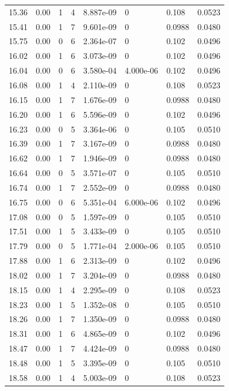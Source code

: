 \documentclass[preview]{standalone}
\begin{document}
{{{\begin{tabular}{L{1.2cm}C{1.2cm} C{0.3cm}C{0.5cm} C{1.4cm}C{1.4cm} C{1.4cm}C{1.4cm}}
  15.36  &  0.00  & 1     &  4 &  8.887e-09  & 0  & 0.108 &  0.0523   \\ 
  15.41  &  0.00  & 1     &  7 &  9.601e-09  & 0  & 0.0988 &  0.0480   \\ 
  15.75  &  0.00  & 0     &  6 &  2.364e-07  & 0  & 0.102 &  0.0496   \\ 
  16.02  &  0.00  & 1     &  6 &  3.073e-09  & 0  & 0.102 &  0.0496   \\ 
  16.04  &  0.00  & 0     &  6 &  3.580e-04  & 4.000e-06  & 0.102 &  0.0496   \\ 
  16.08  &  0.00  & 1     &  4 &  2.110e-09  & 0  & 0.108 &  0.0523   \\ 
  16.15  &  0.00  & 1     &  7 &  1.676e-09  & 0  & 0.0988 &  0.0480   \\ 
  16.20  &  0.00  & 1     &  6 &  5.596e-09  & 0  & 0.102 &  0.0496   \\ 
  16.23  &  0.00  & 0     &  5 &  3.364e-06  & 0  & 0.105 &  0.0510   \\ 
  16.39  &  0.00  & 1     &  7 &  3.167e-09  & 0  & 0.0988 &  0.0480   \\ 
  16.62  &  0.00  & 1     &  7 &  1.946e-09  & 0  & 0.0988 &  0.0480   \\ 
  16.64  &  0.00  & 0     &  5 &  3.571e-07  & 0  & 0.105 &  0.0510   \\ 
  16.74  &  0.00  & 1     &  7 &  2.552e-09  & 0  & 0.0988 &  0.0480   \\ 
  16.75  &  0.00  & 0     &  6 &  5.351e-04  & 6.000e-06  & 0.102 &  0.0496   \\ 
  17.08  &  0.00  & 0     &  5 &  1.597e-09  & 0  & 0.105 &  0.0510   \\ 
  17.51  &  0.00  & 1     &  5 &  3.433e-09  & 0  & 0.105 &  0.0510   \\ 
  17.79  &  0.00  & 0     &  5 &  1.771e-04  & 2.000e-06  & 0.105 &  0.0510   \\ 
  17.88  &  0.00  & 1     &  6 &  2.313e-09  & 0  & 0.102 &  0.0496   \\ 
  18.02  &  0.00  & 1     &  7 &  3.204e-09  & 0  & 0.0988 &  0.0480   \\ 
  18.15  &  0.00  & 1     &  4 &  2.295e-09  & 0  & 0.108 &  0.0523   \\ 
  18.23  &  0.00  & 1     &  5 &  1.352e-08  & 0  & 0.105 &  0.0510   \\ 
  18.26  &  0.00  & 1     &  7 &  1.350e-09  & 0  & 0.0988 &  0.0480   \\ 
  18.31  &  0.00  & 1     &  6 &  4.865e-09  & 0  & 0.102 &  0.0496   \\ 
  18.47  &  0.00  & 1     &  7 &  4.424e-09  & 0  & 0.0988 &  0.0480   \\ 
  18.48  &  0.00  & 1     &  5 &  3.395e-09  & 0  & 0.105 &  0.0510   \\ 
  18.58  &  0.00  & 1     &  4 &  5.003e-09  & 0  & 0.108 &  0.0523   \\ 
\hline 
\end{tabular} 

}}}
\end{document}

